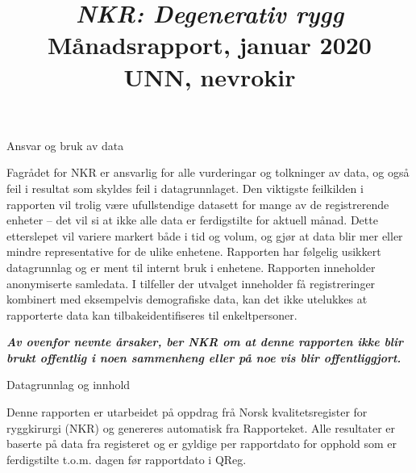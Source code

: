 \documentclass[handout, xcolor=pdftex,dvipsnames,table]{beamer}\usepackage[]{graphicx}\usepackage[]{color}
\begin{document}
\title[Rygg\\UNN, nevrokir \\\today]{\textit{NKR: Degenerativ rygg} \\
Månadsrapport, januar 2020 \\
UNN, nevrokir }
\maketitle


\begin{tiny}

\begin{frame}[fragile] {Ansvar og bruk av data}

Fagrådet for NKR er ansvarlig for alle vurderingar og tolkninger av data, og også feil i resultat som skyldes feil i datagrunnlaget. Den viktigste feilkilden i rapporten vil trolig være ufullstendige datasett for mange av de registrerende enheter – det vil si at ikke alle data er ferdigstilte for aktuell månad. Dette etterslepet vil variere markert både i tid og volum, og gjør at data blir mer eller mindre representative for de ulike enhetene.
Rapporten har følgelig usikkert datagrunnlag og er ment til internt bruk i enhetene. 
Rapporten inneholder anonymiserte samledata. I tilfeller der utvalget inneholder få 
registreringer kombinert med eksempelvis demografiske data, kan det ikke utelukkes at rapporterte data kan tilbakeidentifiseres til enkeltpersoner. 

\textit{\textbf{Av ovenfor nevnte årsaker, ber NKR om at denne rapporten ikke blir brukt 
offentlig i noen sammenheng eller på noe vis blir offentliggjort.}}

\end{frame}



\begin{frame}[fragile] {Datagrunnlag og innhold}

Denne rapporten er utarbeidet på oppdrag frå Norsk kvalitetsregister for ryggkirurgi (NKR) og genereres automatisk
fra Rapporteket. Alle resultater er baserte på data fra registeret og er gyldige per rapportdato for
opphold som er ferdigstilte t.o.m. dagen før rapportdato i QReg. 



\end{frame}
\end{tiny}
\end{document}
